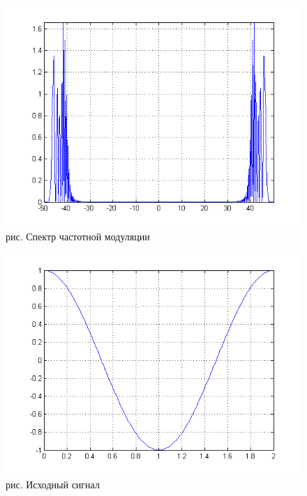 \documentclass[10pt,a4paper]{report}
\begin{document}
\begin{figure}
\begin{center}
\includegraphics[angle=0, scale = 0.8]{8_3}\newline
рис.  Спектр частотной модуляции\newline
\end{center}
\end{figure}
\begin{figure}
\begin{center}
\includegraphics[angle=0, scale = 0.8]{8_4}\newline
рис. Исходный сигнал\newline
\end{center}
\end{figure}
\end{document}
